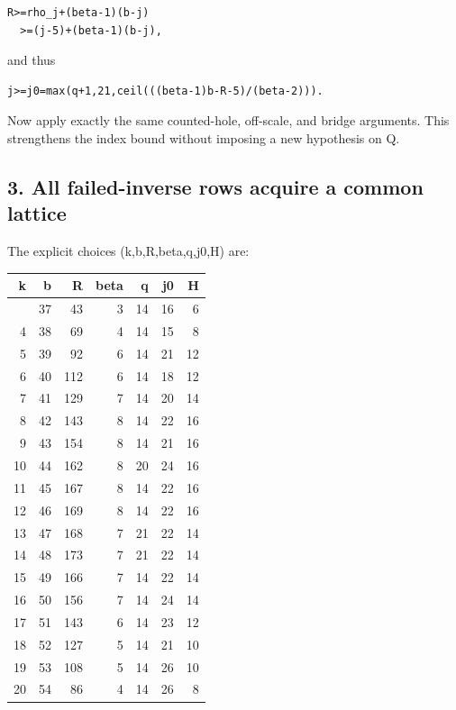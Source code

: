\documentclass[10pt,a4paper]{article}
\theoremstyle{definition}
\begin{document}
\begin{lstlisting}
R>=rho_j+(beta-1)(b-j)
  >=(j-5)+(beta-1)(b-j),
\end{lstlisting}

and thus

\begin{lstlisting}
j>=j0=max(q+1,21,ceil(((beta-1)b-R-5)/(beta-2))).
\end{lstlisting}

Now apply exactly the same counted-hole,\allowbreak{} off-scale,\allowbreak{} and bridge
arguments. This strengthens the index bound without imposing a new
hypothesis on Q.

\hypertarget{all-failed-inverse-rows-acquire-a-common-lattice}{%
\subsection{3. All failed-inverse rows acquire a common
lattice}\label{all-failed-inverse-rows-acquire-a-common-lattice}}

The explicit choices (k,\allowbreak{}b,\allowbreak{}R,\allowbreak{}beta,\allowbreak{}q,\allowbreak{}j0,\allowbreak{}H) are:

\begin{longtable}[]{@{}rrrrrrr@{}}
\toprule\noalign{}
k & b & R & beta & q & j0 & H \\
\midrule\noalign{}
\endhead
\bottomrule\noalign{}
\endlastfoot
3 & 37 & 43 & 3 & 14 & 16 & 6 \\
4 & 38 & 69 & 4 & 14 & 15 & 8 \\
5 & 39 & 92 & 6 & 14 & 21 & 12 \\
6 & 40 & 112 & 6 & 14 & 18 & 12 \\
7 & 41 & 129 & 7 & 14 & 20 & 14 \\
8 & 42 & 143 & 8 & 14 & 22 & 16 \\
9 & 43 & 154 & 8 & 14 & 21 & 16 \\
10 & 44 & 162 & 8 & 20 & 24 & 16 \\
11 & 45 & 167 & 8 & 14 & 22 & 16 \\
12 & 46 & 169 & 8 & 14 & 22 & 16 \\
13 & 47 & 168 & 7 & 21 & 22 & 14 \\
14 & 48 & 173 & 7 & 21 & 22 & 14 \\
15 & 49 & 166 & 7 & 14 & 22 & 14 \\
16 & 50 & 156 & 7 & 14 & 24 & 14 \\
17 & 51 & 143 & 6 & 14 & 23 & 12 \\
18 & 52 & 127 & 5 & 14 & 21 & 10 \\
19 & 53 & 108 & 5 & 14 & 26 & 10 \\
20 & 54 & 86 & 4 & 14 & 26 & 8 \\
\end{longtable}
\end{document}
